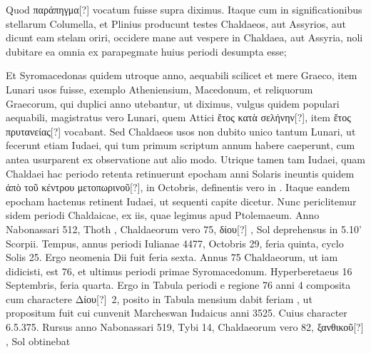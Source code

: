 Quod \textgreek{παράπηγμα[?]}
vocatum fuisse supra diximus.
Itaque cum in significationibus stellarum
Columella, et Plinius producunt testes Chaldaeos, aut Assyrios,
aut dicunt eam stelam oriri, occidere mane aut vespere in Chaldaea,
aut Assyria, noli dubitare ea omnia ex parapegmate huius periodi
desumpta esse;
\begin{table}[htbp]
 
\end{table}
%
Et Syromacedonas quidem utroque anno, aequabili
scilicet et mere Graeco, item Lunari usos fuisse, exemplo Atheniensium,
Macedonum, et reliquorum Graecorum, qui duplici anno
utebantur, ut diximus, vulgus quidem populari aequabili, magistratus
vero Lunari, quem Attici \textgreek{ἔτος κατὰ σελήνην[?]},
 item \textgreek{ἔτος πρυτανείας[?]}
vocabant.
Sed Chaldaeos usos non dubito unico tantum Lunari,
ut fecerunt etiam Iudaei, qui tum primum scriptum annum
habere caeperunt, cum antea usurparent ex observatione aut alio
modo.
Utrique tamen tam Iudaei, quam Chaldaei hac periodo retenta
retinuerunt epocham anni Solaris ineuntis quidem \textgreek{ἀπὸ τοῦ κέντρου
μετοπωρινοῦ[?]}, in  Octobris, definentis vero in .
Itaque eandem
epocham hactenus retinent Iudaei, ut sequenti capite dicetur.
Nunc periclitemur sidem periodi Chaldaicae, ex iis, quae legimus
apud Ptolemaeum.
Anno Nabonassari 512, Thoth , Chaldaeorum
vero 75, \textgreek{δίου[?] },
 Sol deprehensus in 5.10' Scorpii.
Tempus, annus
periodi Iulianae 4477, Octobris 29, feria quinta, cyclo Solis 25.
Ergo neomenia Dii fuit feria sexta.
Annus 75 Chaldaeorum, ut iam
didicisti, est 76, et ultimus periodi primae Syromacedonum.
Hyperberetaeus 16 Septembris, feria quarta.
Ergo in Tabula periodi e regione
76 anni 4 composita cum charactere \textgreek{Δίου[?]}~2, posito in Tabula
mensium dabit feriam , ut propositum fuit cui cunvenit Marcheswan
Iudaicus anni 3525.
%
Cuius character 6.5.375.
Rursus anno Nabonassari
519, Tybi 14, Chaldaeorum vero 82,
 \textgreek{ξανθικοῦ[?] }, Sol obtinebat
